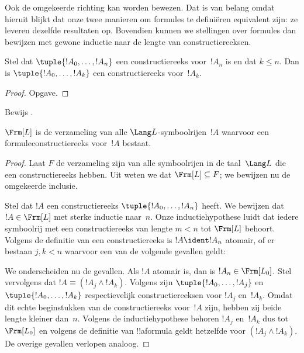 \documentclass[openany]{memoir}
\begin{document}
Ook de omgekeerde richting kan worden bewezen. Dat is van belang omdat
hieruit blijkt dat onze twee manieren om formules te definiëren
equivalent zijn: ze leveren dezelfde resultaten op. Bovendien kunnen we
stellingen over formules dan bewijzen met gewone inductie naar de lengte
van constructiereeksen.

\begin{lem}
Stel dat $\tuple{!A_0,\dotsc,!A_n}$ een constructiereeks voor~$!A_n$
is en dat $k \leq n$. Dan is $\tuple{!A_0,\dotsc,!A_k}$ een
constructiereeks voor~$!A_k$.
\end{lem}

\begin{proof}
Opgave.
\end{proof}

\begin{prob}
Bewijs .
\end{prob}

\begin{thm}
$\Frm[L]$ is de verzameling van alle $\Lang L$-symboolrijen~$!A$
waarvoor een formuleconstructiereeks voor~$!A$ bestaat.
\end{thm}

\begin{proof}
Laat $F$ de verzameling zijn van alle symboolrijen in de taal~$\Lang L$
die een constructiereeks hebben. Uit
 weten we dat $\Frm[L] \subseteq F$;
we bewijzen nu de omgekeerde inclusie.

Stel dat $!A$ een constructiereeks $\tuple{!A_0,\dotsc,!A_n}$ heeft.
We bewijzen dat $!A \in \Frm[L]$ met sterke inductie naar~$n$.
Onze inductiehypothese luidt dat iedere symboolrij met een
constructiereeks van lengte $m < n$ tot $\Frm[L]$ behoort.
Volgens de definitie van een constructiereeks is $!A \ident !A_n$
atomair, of er bestaan $j,k < n$ waarvoor een van de volgende gevallen
geldt:
\begin{enumerate}
\end{enumerate}
We onderscheiden nu de gevallen. Als $!A$ atomair is, dan is
$!A_n \in \Frm[L_0]$. Stel vervolgens dat
$!A \equiv (!A_j \land !A_k)$. Volgens
 zijn
$\tuple{!A_0,\dotsc,!A_j}$ en $\tuple{!A_0,\dotsc,!A_k}$
respectievelijk constructiereeksen voor $!A_j$ en~$!A_k$. Omdat dit
echte beginstukken van de constructiereeks voor~$!A$ zijn, hebben zij
beide lengte kleiner dan~$n$. Volgens de inductiehypothese behoren
$!A_j$ en~$!A_k$ dus tot~$\Frm[L_0]$ en volgens de definitie van
!!a{formula} geldt hetzelfde voor $(!A_j \land !A_k)$. De overige
gevallen verlopen analoog.
\end{proof}
\end{document}
